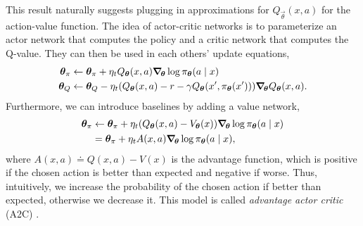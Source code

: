 This result naturally suggests plugging in approximations for
$Q_{\vec{\theta}}(x,a)$ for the action-value function. The idea of actor-critic
networks is to parameterize an actor network that computes the policy and a
critic network that computes the Q-value. They can then be used in each others'
update equations, 
\begin{align*}
  \vec{\theta}_\pi &\gets \vec{\theta}_\pi + \eta_t Q_{\vec{\theta}}(x,a) \grad{\log \pi_{\vec{\theta}}(a\mid x)}{\vec{\theta}} \\
  \vec{\theta}_Q &\gets \vec{\theta}_Q - \eta_t \lft( Q_{\vec{\theta}}(x,a) - r - \gamma Q_{\vec{\theta}}(x',\pi_{\vec{\theta}}(x')) \rgt) \grad{Q_{\vec{\theta}}(x,a)}{\vec{\theta}}.
\end{align*}
Furthermore, we can introduce baselines by adding a value network,
\begin{align*}
  \bm{\theta}_\pi &\gets \bm{\theta}_\pi + \eta_t ( Q_{\bm{\theta}}(x,a) - V_{\bm{\theta}}(x)) \bm{\nabla}_{\! \bm{\theta}} \log \pi_{\bm{\theta}}(a\mid x) \\
  &= \bm{\theta}_\pi + \eta_t A(x,a) \bm{\nabla}_{\! \bm{\theta}} \log \pi_{\bm{\theta}}(a\mid x),
\end{align*}
where $A(x,a) \doteq Q(x,a) - V(x)$ is the advantage function, which is
positive if the chosen action is better than expected and negative if worse.
Thus, intuitively, we increase the probability of the chosen action if better
than expected, otherwise we decrease it. This model is called \textit{advantage
actor critic} (A2C) \citep{mnih2016asynchronous}.

